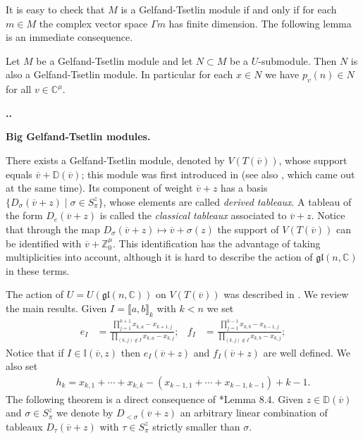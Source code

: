 \documentclass[11pt,fleqn]{amsart}
\renewcommand\thesection{\arabic{section}}
\newcounter{para}[section]
\renewcommand\thepara{\thesection.\arabic{para}}
\def\paragraph{%
 \noindent
 \refstepcounter{para}%
 \textbf{\thepara.}\hspace{1ex}%
}
\newcommand\about[1]{%
 {\bfseries#1.}%
}
\newcommand\CC{\mathbb C}
\newcommand\ZZ{\mathbb Z}
\newcommand\gl{\mathfrak{gl}}
\newcommand\vv{\overline{v}}
\newcommand\II{\mathbb I}
\newcommand\interval[1]{\llbracket #1 \rrbracket}
\newcommand\DD{\mathbb D}
\begin{document}
It is easy to check that $M$ is a Gelfand-Tsetlin module if and only if for 
each $m \in M$ the complex vector space $\Gamma m$ has finite dimension. The
following lemma is an immediate consequence.
\begin{Lemma}
\label{L:sub-gt}
Let $M$ be a Gelfand-Tsetlin module and let $N \subset M$ be a $U$-submodule.
Then $N$ is also a Gelfand-Tsetlin module. In particular for each $x \in N$
we have $p_v(n) \in N$ for all $v \in \CC^\mu$.
\end{Lemma}

\paragraph
\about{Big Gelfand-Tsetlin modules}
\label{big-gt-modules}
There exists a Gelfand-Tsetlin module, denoted by $V(T(\vv))$, whose support 
equals $\vv + \DD(\vv)$; this module was first introduced in \cite{RZ18} 
(see also \cite{EMV18}, which came out at the same time). Its component of 
weight $\vv + z$ has a basis $\{D_\sigma(\vv+z) \mid \sigma \in S_\pi^z\}$, 
whose elements are called \emph{derived tableaux}. A tableau of the form 
$D_e(\vv + z)$ is called the \emph{classical tableaux} associated to $\vv + z$.
Notice that through the map $D_\sigma (\vv + z) \mapsto \vv + \sigma(z)$ the
support of $V(T(\vv))$ can be identified with $\vv + \ZZ^\mu_0$. This 
identification has the advantage of taking multiplicities into account, 
although it is hard to describe the action of $\gl(n,\CC)$ in these terms.

The action of $U = U(\gl(n,\CC))$ on $V(T(\vv))$ was described in 
\cite{FGRZ18}. We review the main results. Given $I = \interval{a,b}_k$ with 
$k <n$ we set
\begin{align*}
e_I
	&= \frac{\displaystyle \prod_{j = 1}^{k+1} x_{k,a} - x_{k+1,j}}
		{\displaystyle \prod_{(k,j) \notin I} x_{k,a} - x_{k,j}};
&f_I
	&= \frac{\displaystyle \prod_{j = 1}^{k-1} x_{k,b} - x_{k-1,j}}
		{\displaystyle \prod_{(k,j) \notin I} x_{k,b} - x_{k,j}};
\end{align*}
Notice that if $I \in \II(\vv,z)$ then $e_I(\vv + z)$ and $f_I(\vv + z)$ are
well defined. We also set 
\begin{align*}
h_k = x_{k,1} + \cdots + x_{k,k} - (x_{k-1, 1} + \cdots + x_{k-1,k-1}) + k-1.
\end{align*}
The following theorem is a direct consequence of \cite{FGRZ18}*{Lemma 8.4}.
Given $z \in \DD(\vv)$ and $\sigma \in S_\pi^z$ we denote by $D_{<\sigma}(\vv 
+ z)$ an arbitrary linear combination of tableaux $D_\tau(\vv + z)$ with 
$\tau \in S_\pi^z$ strictly smaller than $\sigma$.
\end{document}
